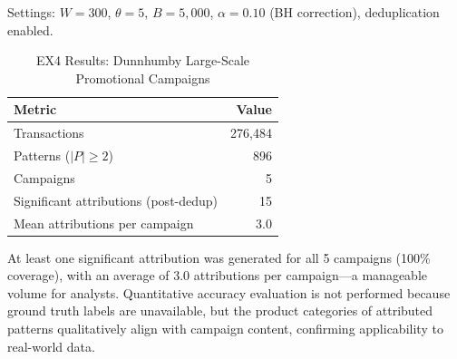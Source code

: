 Settings: $W = 300$, $\theta = 5$, $B = 5{,}000$, $\alpha = 0.10$ (BH correction),
deduplication enabled.

\begin{table}[t]
\caption{EX4 Results: Dunnhumby Large-Scale Promotional Campaigns}
\label{tab:ex4_dunnhumby}
\centering
\begin{tabular}{lr}
\toprule
Metric & Value \\
\midrule
Transactions & 276{,}484 \\
Patterns ($|P| \geq 2$) & 896 \\
Campaigns & 5 \\
Significant attributions (post-dedup) & 15 \\
Mean attributions per campaign & 3.0 \\
\bottomrule
\end{tabular}
\end{table}

At least one significant attribution was generated for all 5 campaigns
(100\% coverage), with an average of 3.0 attributions per campaign---a
manageable volume for analysts.
Quantitative accuracy evaluation is not performed because ground truth labels are unavailable,
but the product categories of attributed patterns qualitatively align with campaign content,
confirming applicability to real-world data.
